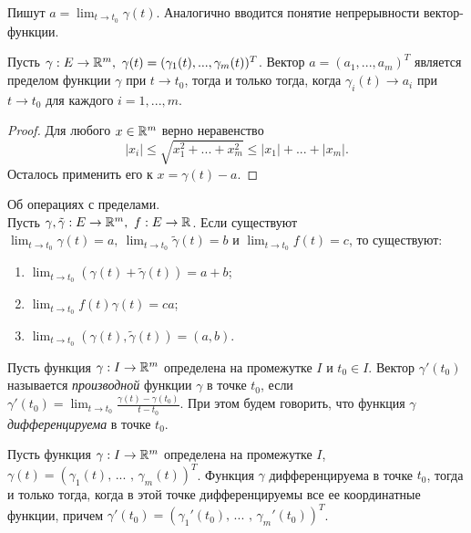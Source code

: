     Пишут $a = \lim_{t \to t_{0}} \gamma(t)$. Аналогично вводится понятие непрерывности вектор-функции.
    
    \begin{theorem}
        Пусть $\gamma: E \to \mathbb{R}^{m}, \ \gamma(t) = (\gamma_{1}(t), ... , \gamma_{m}(t))^{T}$. Вектор $a = (a_{1}, ... , a_{m})^{T}$ является пределом функции $\gamma$ при $t \to t_{0}$, тогда и только тогда, когда $\gamma_{i}(t) \to a_{i}$ при $t \to t_{0}$ для каждого $i = 1, ... , m$.
    \end{theorem}
    
    \begin{proof}
        Для любого $x \in \mathbb{R}^{m}$ верно неравенство
        \[|x_{i}| \leq \sqrt{x_{1}^2 + ... + x_{m}^2} \leq |x_{1}| + ... + |x_{m}|.\]
        Осталось применить его к $x = \gamma(t) - a$.
    \end{proof}
    
    \begin{corollary}{Об операциях с пределами.}\\
        Пусть $\gamma, \tilde\gamma: E \to \mathbb{R}^m, \ f: E \to \mathbb{R}$. Если существуют $\lim_{t \to t_{0}}\gamma(t) = a, \ \lim_{t \to t_{0}}\tilde\gamma(t) = b$ и $\lim_{t \to t_{0}} f(t) = c$, то существуют:
        \begin{enumerate}
            \item $\lim_{t \to t_{0}}(\gamma(t) + \tilde\gamma(t)) = a + b$;
            \item $\lim_{t \to t_{0}} f(t)\gamma(t) = ca$;
            \item $\lim_{t \to t_{0}}(\gamma(t), \tilde\gamma(t)) = (a, b)$.
        \end{enumerate}
    \end{corollary}
    
    \begin{definition}
        Пусть функция $\gamma: I \to \mathbb{R}^m$ определена на промежутке $I$ и $t_{0} \in I$. Вектор $\gamma'(t_{0})$ называется \textit{производной} функции $\gamma$ в точке $t_{0}$, если $\gamma'(t_{0}) = \lim_{t \to t_{0}}\frac{\gamma(t) - \gamma(t_{0})}{t - t_{0}}$. При этом будем говорить, что функция $\gamma$ \textit{дифференцируема} в точке $t_{0}$.
    \end{definition}
    
    \begin{corollary}
        Пусть функция $\gamma: I \to \mathbb{R}^m$ определена на промежутке $I$, $\gamma(t) = (\gamma_{1}(t)\text{, ... , } \gamma_{m}(t))^{T}$. Функция $\gamma$ дифференцируема в точке $t_{0}$, тогда и только тогда, когда в этой точке дифференцируемы все ее координатные функции, причем $\gamma'(t_{0}) = (\gamma_{1}'(t_{0})\text{, ... , }\gamma_{m}'(t_{0}))^{T}$.
    \end{corollary}
    
